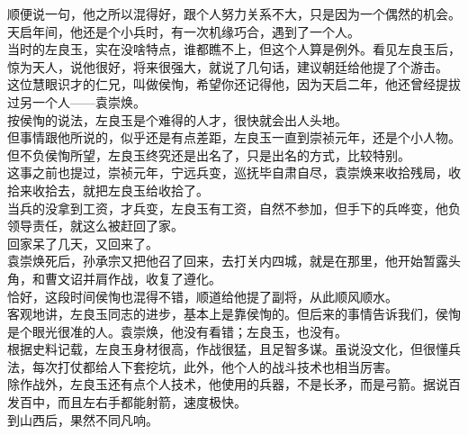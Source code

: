 \begin{multicols}{\theparacolNo}
顺便说一句，他之所以混得好，跟个人努力关系不大，只是因为一个偶然的机会。\\

天启年间，他还是个小兵时，有一次机缘巧合，遇到了一个人。\\

当时的左良玉，实在没啥特点，谁都瞧不上，但这个人算是例外。看见左良玉后，惊为天人，说他很好，将来很强大，就说了几句话，建议朝廷给他提了个游击。\\

这位慧眼识才的仁兄，叫做侯恂，希望你还记得他，因为天启二年，他还曾经提拔过另一个人——袁崇焕。\\

按侯恂的说法，左良玉是个难得的人才，很快就会出人头地。\\

但事情跟他所说的，似乎还是有点差距，左良玉一直到崇祯元年，还是个小人物。\\

但不负侯恂所望，左良玉终究还是出名了，只是出名的方式，比较特别。\\

这事之前也提过，崇祯元年，宁远兵变，巡抚毕自肃自尽，袁崇焕来收拾残局，收拾来收拾去，就把左良玉给收拾了。\\

当兵的没拿到工资，才兵变，左良玉有工资，自然不参加，但手下的兵哗变，他负领导责任，就这么被赶回了家。\\

回家呆了几天，又回来了。\\

袁崇焕死后，孙承宗又把他召了回来，去打关内四城，就是在那里，他开始暂露头角，和曹文诏并肩作战，收复了遵化。\\

恰好，这段时间侯恂也混得不错，顺道给他提了副将，从此顺风顺水。\\

客观地讲，左良玉同志的进步，基本上是靠侯恂的。但后来的事情告诉我们，侯恂是个眼光很准的人。袁崇焕，他没有看错；左良玉，也没有。\\

根据史料记载，左良玉身材很高，作战很猛，且足智多谋。虽说没文化，但很懂兵法，每次打仗都给人下套挖坑，此外，他个人的战斗技术也相当厉害。\\

除作战外，左良玉还有点个人技术，他使用的兵器，不是长矛，而是弓箭。据说百发百中，而且左右手都能射箭，速度极快。\\

到山西后，果然不同凡响。\\


\end{multicols}
